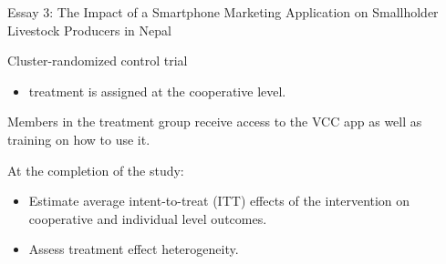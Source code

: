 \documentclass[aspectratio=169]{beamer}
\newenvironment{wideitemize}{\itemize\addtolength{\itemsep}{10pt}}{\enditemize}
\begin{document}
\begin{frame}{Essay 3: The Impact of a Smartphone Marketing Application on Smallholder Livestock Producers in Nepal}

    \begin{wideitemize}
        \item Cluster-randomized control trial \vspace{.25cm}
        \begin{itemize}
            \item treatment is assigned at the cooperative level.
        \end{itemize}
        \item Members in the treatment group receive access to the VCC app as well as training on how to use it.
        \item At the completion of the study:
        \begin{itemize}
            \item Estimate average intent-to-treat (ITT) effects of the intervention on cooperative and individual level outcomes.
            \item Assess treatment effect heterogeneity.
        \end{itemize}
    \end{wideitemize}
\end{frame}
\end{document}

